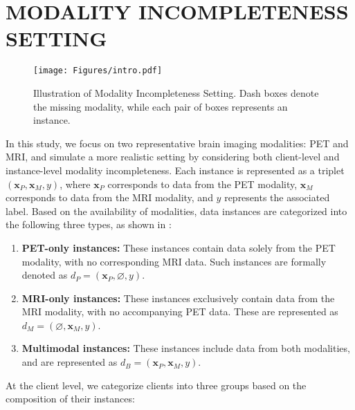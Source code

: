 \section{MODALITY INCOMPLETENESS SETTING}
\label{setting}
\begin{figure}[t] 
    \centering
    \texttt{[image: Figures/intro.pdf]} %
    \caption{Illustration of Modality Incompleteness Setting. Dash boxes denote the missing modality, while each pair of boxes represents an instance. }
    \label{fig:setting}
\end{figure}

In this study, we focus on two representative brain imaging modalities: PET and MRI, and simulate a more realistic setting by considering both client-level and instance-level modality incompleteness. Each instance is represented as a triplet \( (\mathbf{x}_P, \mathbf{x}_M, y) \), where \( \mathbf{x}_P \) corresponds to data from the PET modality, \( \mathbf{x}_M \) corresponds to data from the MRI modality, and \( y \) represents the associated label. Based on the availability of modalities, data instances are categorized into the following three types, as shown in :

\begin{enumerate}
    \item \textbf{PET-only instances:} These instances contain data solely from the PET modality, with no corresponding MRI data. Such instances are formally denoted as \( d_P = (\mathbf{x}_P, \varnothing, y) \).

    \item \textbf{MRI-only instances:} These instances exclusively contain data from the MRI modality, with no accompanying PET data. These are represented as \( d_M = (\varnothing, \mathbf{x}_M, y) \).

    \item \textbf{Multimodal instances:} These instances include data from both modalities, and are represented as \( d_B = (\mathbf{x}_P, \mathbf{x}_M, y) \).
\end{enumerate}

At the client level, we categorize clients into three groups based on the composition of their instances:

